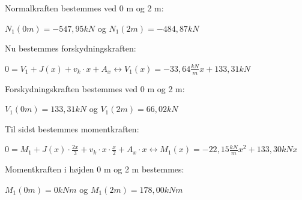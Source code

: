 Normalkraften bestemmes ved 0 m og 2 m:
\begin{center}
	$N_1(0m) = -547,\!95 kN$ og	$N_1(2m) = -484,\!87 kN$
\end{center}

Nu bestemmes forskydningskraften:
\begin{center}
	$0 = V_1 + J(x) + v_k \cdot x + A_x \leftrightarrow V_1(x) = -33,\!64\frac{kN}{m} x + 133,\!31 kN$
\end{center}

Forskydningskraften bestemmes ved 0 m og 2 m:
\begin{center}
	$V_1(0m) = 133,\!31 kN$ og $V_1(2m) = 66,\!02 kN$
\end{center}

Til sidst bestemmes momentkraften:
\begin{center}
	$0 = M_1 + J(x) \cdot \frac{2x}{3} + v_k \cdot x \cdot \frac{x}{2} + A_x \cdot x \leftrightarrow M_1(x) = -22,\!15\frac{kN}{m} x^2 + 133,\!30kN x$
\end{center}

Momentkraften i højden 0 m og 2 m bestemmes:
\begin{center}
	$M_1(0m) = 0 kNm$  og $M_1(2m) = 178,\!00 kNm$
\end{center}

